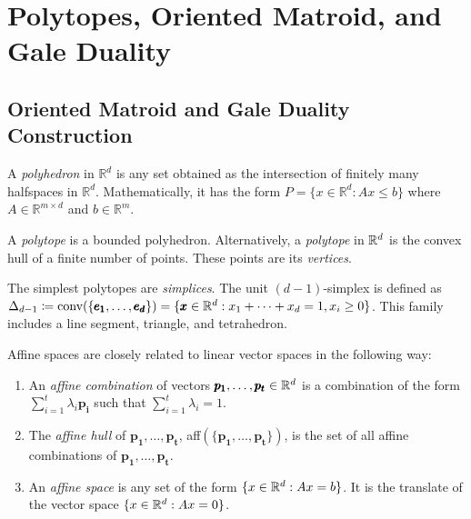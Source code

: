 \section{Polytopes, Oriented Matroid, and Gale Duality}

\subsection{Oriented Matroid and Gale Duality Construction}

\begin{definition}[Polyhedron]
    A \textit{polyhedron} in $\mathbb{R}^d$ is any set obtained as the intersection of finitely many halfspaces in $\mathbb{R}^d$.
    Mathematically, it has the form $P = \{x \in \mathbb{R}^d: Ax \leq b \}$ where $A \in \mathbb{R}^{m\times d}$ and $b \in \mathbb{R}^m$.
\end{definition}

\begin{definition}[Polytope]
    A \textit{polytope} is a bounded polyhedron.
    Alternatively, a \textit{polytope} in $\mathbb{R}^d$ is the convex hull of a finite number of points.
    These points are its \textit{vertices}.
\end{definition}

\begin{definition}[Simplices]
    The simplest polytopes are \textit{simplices}.
    The unit $(d-1)$-simplex is defined as $\Delta_{d-1} \coloneqq \text{conv}(\{\pmb{e_1}, \dots, \pmb{e_d}\}) = \{ \pmb{x} \in \mathbb{R}^d : x_1 + \dots + x_d = 1, x_i \geq 0 \}$.
    This family includes a line segment, triangle, and tetrahedron.
\end{definition}

\begin{definition}
    Affine spaces are closely related to linear vector spaces in the following way:
    \begin{enumerate}
        \item An \textit{affine combination} of vectors $\pmb{p_1}, \dots, \pmb{p_t} \in \mathbb{R}^d$ is a combination of the form $\sum_{i=1}^t \lambda_i \pmb{p_i}$ such that $\sum_{i=1}^t \lambda_i = 1$.
        \item The \textit{affine hull} of $\pmb{p_1}, \dots, \pmb{p_t}$, aff$(\{\pmb{p_1}, \dots, \pmb{p_t}\})$, is the set of all affine combinations of $\pmb{p_1}, \dots, \pmb{p_t}$.
        \item An \textit{affine space} is any set of the form $\lbrace x \in \mathbb{R}^d : Ax = b \rbrace$. It is the translate of the vector space $\lbrace x \in \mathbb{R}^d : Ax = 0 \rbrace$.
    \end{enumerate}
\end{definition}

